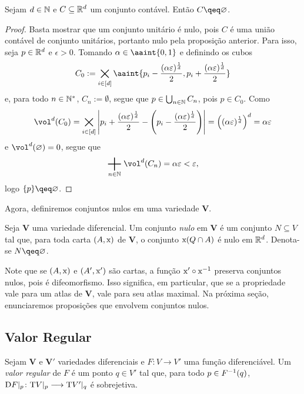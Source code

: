 \begin{prop}
Sejam $d \in \mathbb{N}$ e $C \subseteq \mathbb{R}^d$ um conjunto contável. Então $C \qeq \emptyset$.
\end{prop}
\begin{proof}
Basta mostrar que um conjunto unitário é nulo, pois $C$ é uma união contável de conjunto unitários, portanto nulo pela proposição anterior. Para isso, seja $p \in \mathbb{R}^d$ e $\epsilon > 0$. Tomando $\alpha \in \aaint{0,1}$ e definindo os cubos
		\begin{equation*}
		C_0 := \bigtimes_{i \in [d]} \aaint{p_i - \frac{(\alpha\varepsilon)^{\frac{1}{d}}}{2}, p_i + \frac{(\alpha\varepsilon)^{\frac{1}{d}}}{2}}
		\end{equation*}
e, para todo $n \in \mathbb{N}^*$, $C_n := \emptyset$, segue que $p \in \bigcup_{n \in \mathbb{N}} C_n$, pois $p \in C_0$. Como
	\begin{equation*}
	\vol^d(C_0) = \bigtimes_{i \in [d]} \abs{p_i + \frac{(\alpha\varepsilon)^{\frac{1}{d}}}{2} - \left(p_i - \frac{(\alpha\varepsilon)^{\frac{1}{d}}}{2} \right)} = \left( (\alpha\varepsilon)^{\frac{1}{d}} \right)^d = \alpha\varepsilon
	\end{equation*}
e $\vol^d(\emptyset)=0$, segue que
	\begin{equation*}
	\sum_{n \in \N} \vol^d(C_n) = \alpha\varepsilon < \varepsilon,
	\end{equation*}
logo $\{p\} \qeq \emptyset$.
\end{proof}

Agora, definiremos conjuntos nulos em uma variedade $\bm V$.

\begin{defi}
Seja $\bm V$ uma variedade diferencial. Um conjunto \emph{nulo} em $\bm V$ é um conjunto $N \subseteq V$ tal que, para toda carta $(A,\mathrm{x})$ de $\bm V$, o conjunto $\mathrm{x}(Q \cap A)$ é nulo em $\mathbb{R}^d$. Denota-se $N \qeq \emptyset$.
\end{defi}

Note que se $(A,\mathrm{x})$ e $(A',\mathrm{x}')$ são cartas, a função $\mathrm{x}' \circ \mathrm{x}^{-1}$ preserva conjuntos nulos, pois é difeomorfismo. Isso significa, em particular, que se a propriedade vale para um atlas de $\bm V$, vale para seu atlas maximal. Na próxima seção, enunciaremos proposições que envolvem conjuntos nulos.

\subsection{Valor Regular}

\begin{defi}
Sejam $\bm V$ e $\bm V'$ variedades diferenciais e $F\colon V \to V'$ uma função diferenciável. Um \emph{valor regular} de $F$ é um ponto $q \in V'$ tal que, para todo $p \in F^{-1}(q)$, $\mathrm{D} F|_p\colon \mathrm{T} V|_p \longrightarrow \mathrm{T} V'|_q$ é  sobrejetiva.
\end{defi}

